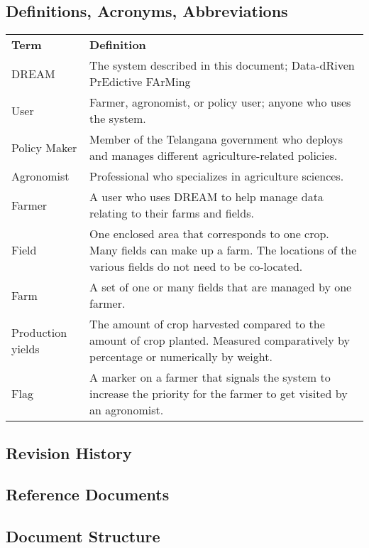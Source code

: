 \subsection{Definitions, Acronyms, Abbreviations}


\begin{center}
\renewcommand{\arraystretch}{1.25}
\begin{tabular}{l >{\raggedright\arraybackslash}p{12cm} } \hline
    \textbf{Term} & \textbf{Definition}\\ 
    DREAM & The system described in this document; Data-dRiven PrEdictive FArMing\\
    User & Farmer, agronomist, or policy user; anyone who uses the system.\\

	Policy Maker & Member of the Telangana government who deploys and manages different agriculture-related policies. \\
	Agronomist & Professional who specializes in agriculture sciences. \\
    Farmer & A user who uses DREAM to help manage data relating to their farms and fields.\\
    Field & One enclosed area that corresponds to one crop. Many fields can make up a farm. The locations of the various fields do not need to be co-located.\\
    Farm & A set of one or many fields that are managed by one farmer.\\
    Production yields & The amount of crop harvested compared to the amount of crop planted. Measured comparatively by percentage or numerically by weight.\\
    Flag & A marker on a farmer that signals the system to increase the priority for the farmer to get visited by an agronomist.\\
    \hline
\end{tabular}
\end{center}

\subsection{Revision History}
\subsection{Reference Documents}
\subsection{Document Structure}